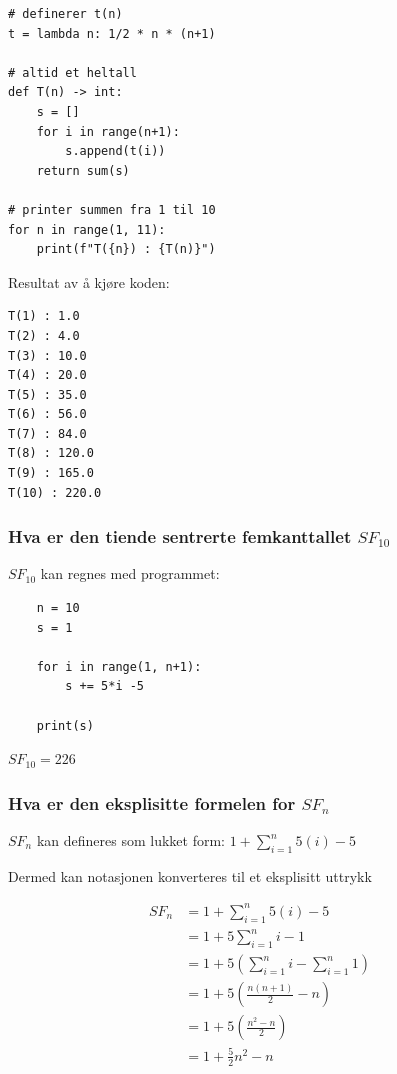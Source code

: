 \documentclass{article}
\begin{document}
\begin{verbatim}
# definerer t(n)
t = lambda n: 1/2 * n * (n+1)

# altid et heltall
def T(n) -> int:
    s = []
    for i in range(n+1):
        s.append(t(i))
    return sum(s)

# printer summen fra 1 til 10
for n in range(1, 11):
    print(f"T({n}) : {T(n)}")
\end{verbatim}

Resultat av å kjøre koden:

\begin{verbatim}
T(1) : 1.0
T(2) : 4.0
T(3) : 10.0
T(4) : 20.0
T(5) : 35.0
T(6) : 56.0
T(7) : 84.0
T(8) : 120.0
T(9) : 165.0
T(10) : 220.0
\end{verbatim}

\subsubsection{Hva er den tiende sentrerte femkanttallet $SF_{10}$}

$SF_{10}$ kan regnes med programmet:

\begin{verbatim}
    n = 10
    s = 1

    for i in range(1, n+1):
        s += 5*i -5

    print(s)
\end{verbatim}

$SF_{10} = 226$

\subsubsection{Hva er den eksplisitte formelen for $SF_n$}

$SF_n$ kan defineres som lukket form:  $1 + \sum_{i=1}^{n} 5(i)-5$

Dermed kan notasjonen konverteres til et eksplisitt uttrykk

\begin{align*}
    SF_n &= 1 +\sum_{i=1}^{n} 5(i)-5 \\ 
    &=  1 +5 \sum_{i=1}^{n} i-1 \\ 
    &=  1 +5 ( \sum_{i=1}^{n} i - \sum_{i=1}^{n} 1 ) \\
    &=  1 +5 ( \frac{n(n+1)}{2} - {n} ) \\
    &=  1 +5 ( \frac{n^2-n}{2} ) \\
    &=  1 +\frac{5}{2} n^2-n
\end{align*}
\end{document}

